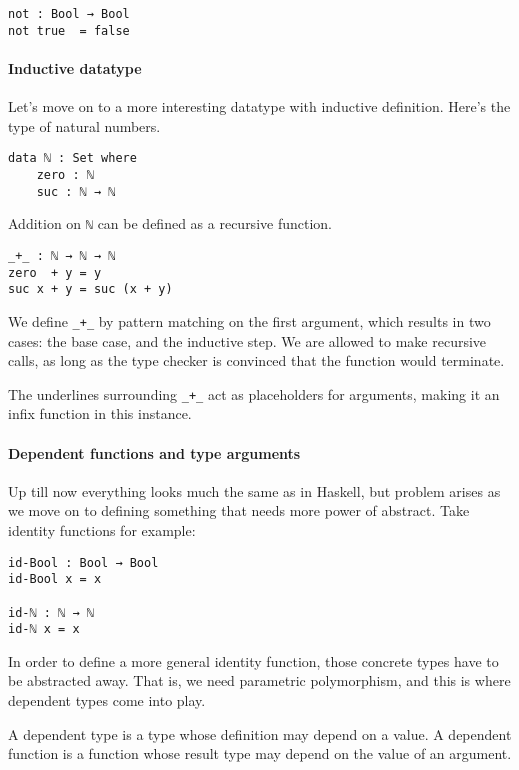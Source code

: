 \documentclass[12pt, a4paper]{article}
\begin{document}
\begin{lstlisting}
not : Bool → Bool
not true  = false
\end{lstlisting}

\paragraph{Inductive datatype} Let's move on to a more interesting datatype with inductive definition. Here's the type of natural numbers.
\begin{lstlisting}
data ℕ : Set where
    zero : ℕ
    suc : ℕ → ℕ
\end{lstlisting}

Addition on {\lstinline|ℕ|} can be defined as a recursive function.

\begin{lstlisting}
_+_ : ℕ → ℕ → ℕ
zero  + y = y
suc x + y = suc (x + y)
\end{lstlisting}

We define {\lstinline|_+_|} by pattern matching on the first argument, which results
in two cases: the base case, and the inductive step. We are allowed to make
recursive calls, as long as the type checker is convinced that the function
would terminate.

The underlines surrounding {\lstinline|_+_|} act as placeholders for arguments, making
it an infix function in this instance.

\paragraph{Dependent functions and type arguments}
Up till now everything looks much the same as in Haskell, but problem arises as
we move on to defining something that needs more power of abstract. Take identity
functions for example:

\begin{lstlisting}
id-Bool : Bool → Bool
id-Bool x = x

id-ℕ : ℕ → ℕ
id-ℕ x = x
\end{lstlisting}

In order to define a more general identity function, those concrete types have
to be abstracted away. That is, we need parametric polymorphism, and this is
where dependent types come into play.

A dependent type is a type whose definition may depend on a value. A dependent
function is a function whose result type may depend on the value of an argument.
\end{document}
